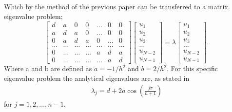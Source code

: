 \documentclass{emulateapj}
\begin{document}
Which by the method of the previous paper can be transferred to a matrix eigenvalue problem;
%
\begin{equation*}
    \begin{bmatrix} d& a & 0   & 0    & \dots  &0     & 0 \\
                                a & d & a & 0    & \dots  &0     &0 \\
                                0   & a & d & a  &0       &\dots & 0\\
                                \dots  & \dots & \dots & \dots  &\dots      &\dots & \dots\\
                                0   & \dots & \dots & \dots  &a  &d & a\\
                                0   & \dots & \dots & \dots  &\dots       &a & d\end{bmatrix} 
                                 \begin{bmatrix} u_1 \\ u_2 \\ u_3 \\ \dots \\ u_{N-2} \\ u_{N-1}\end{bmatrix} = \lambda \begin{bmatrix} u_1 \\ u_2 \\ u_3 \\ \dots \\ u_{N-2} \\ u_{N-1}\end{bmatrix} . 
\label{eq:matrixse} 
\end{equation*}
%
Where a and b are defined as $a = -1/h^2$ and $b = 2/h^2$. For this specific eigenvalue problem the analytical eigenvalues are, as stated in \cite{2}
%
\begin{gather}\label{eq:eigenvals_analytical}
    \lambda_j = d + 2a\cos\left(\frac{j\pi}{n+1}\right)
\end{gather}
for $j = 1,2,...,n-1$. 
\end{document}
